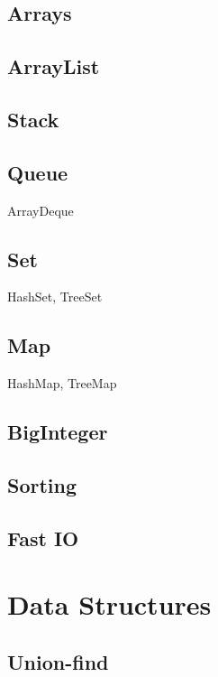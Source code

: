 \documentclass[10pt]{article}
\begin{document}
\subsection{Arrays}

\subsection{ArrayList}

\subsection{Stack}

\subsection{Queue}

ArrayDeque

\subsection{Set}

HashSet, TreeSet

\subsection{Map}

HashMap, TreeMap

\subsection{BigInteger}

\subsection{Sorting}

\subsection{Fast IO} \label{sec:fastio}

\section{Data Structures}

\subsection{Union-find}
\end{document}
